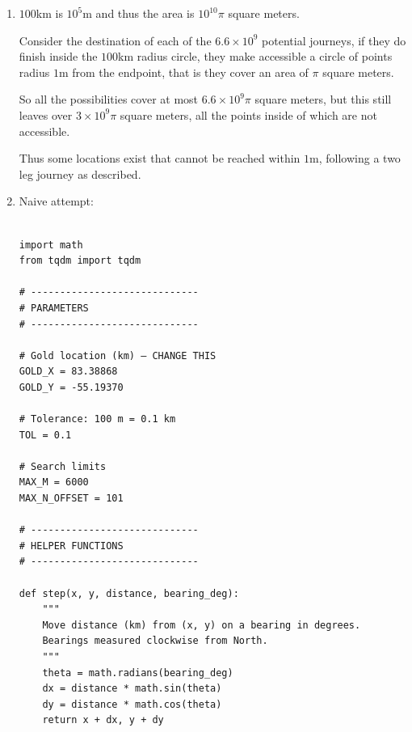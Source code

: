 \documentclass{article}
\begin{document}
\begin{enumerate}
(There is some subtlety to this argument, since we first discard the journeys that end outside the radius to consider a true count with duplicates: $U'$, with $U'\leq U=1.32\times10^{10}$, then see that omitting the duplicates yields $\frac{U'}{2} \leq \frac{U}{2}$)

Thus we establish an upper bound on the number of two leg journeys that finish within $101$km of the starting point 

$$U = 6.6\times 10^9 < 10^{10}$$

\item $100$km is $10^5$m and thus the area is $10^{10}\pi$ square meters.

Consider the destination of each of the $6.6\times 10^9$ potential journeys, if they do finish inside the $100$km radius circle, they make accessible a circle of points radius $1$m from the endpoint, that is they cover an area of $\pi$ square meters.

So all the possibilities cover at most $6.6\times 10^9 \pi$ square meters, but this still leaves over $3 \times 10^9 \pi $ square meters, all the points inside of which are not accessible.

Thus some locations exist that cannot be reached within $1$m, following a two leg journey as described.

\item 

Naive attempt:

\newpage{}



\begin{verbatim}

import math
from tqdm import tqdm

# -----------------------------
# PARAMETERS
# -----------------------------

# Gold location (km) — CHANGE THIS
GOLD_X = 83.38868
GOLD_Y = -55.19370

# Tolerance: 100 m = 0.1 km
TOL = 0.1

# Search limits
MAX_M = 6000
MAX_N_OFFSET = 101

# -----------------------------
# HELPER FUNCTIONS
# -----------------------------

def step(x, y, distance, bearing_deg):
    """
    Move distance (km) from (x, y) on a bearing in degrees.
    Bearings measured clockwise from North.
    """
    theta = math.radians(bearing_deg)
    dx = distance * math.sin(theta)
    dy = distance * math.cos(theta)
    return x + dx, y + dy



\end{verbatim}
\end{enumerate}
\end{document}
